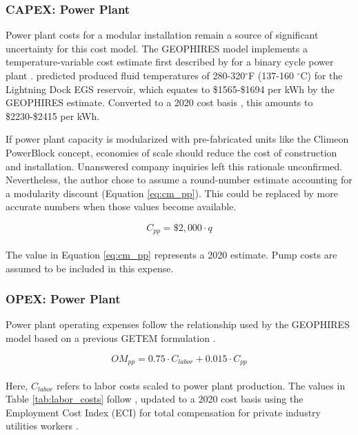 \subsubsection{CAPEX: Power Plant}
\label{ch4:cm_capex_pp}

Power plant costs for a modular installation remain a source of significant uncertainty for this cost model. The GEOPHIRES model implements a temperature-variable cost estimate first described by \citet{tester_future_2006} for a binary cycle power plant \citep{beckers_introducing_2013}. \citet{schochet_development_2001} predicted produced fluid temperatures of 280-320$^\circ$F (137-160 $^\circ$C) for the Lightning Dock EGS reservoir, which equates to \$1565-\$1694 per kWh by the GEOPHIRES estimate. Converted to a 2020 cost basis \citep{us_bls_ppi_2021}, this amounts to \$2230-\$2415 per kWh.

If power plant capacity is modularized with pre-fabricated units like the Climeon PowerBlock concept, economies of scale should reduce the cost of construction and installation. Unanswered company inquiries left this rationale unconfirmed. Nevertheless, the author chose to assume a round-number estimate accounting for a modularity discount (Equation \ref{eq:cm_pp}). This could be replaced by more accurate numbers when those values become available.

\begin{equation}
\label{eq:cm_pp}
    C_{pp} = \$2,000 \cdot q
\end{equation}
\\
The value in Equation \ref{eq:cm_pp} represents a 2020 estimate. Pump costs are assumed to be included in this expense.

\subsubsection{OPEX: Power Plant}
\label{ch4:cm_opex_pp}

Power plant operating expenses follow the relationship used by the GEOPHIRES model based on a previous GETEM formulation \citep[Equation 9,\ ][]{beckers_introducing_2013}.

\begin{equation}
\label{eq:cm_om_pp}
    OM_{pp} = 0.75 \cdot C_{labor} + 0.015 \cdot C_{pp}
\end{equation}
\\
Here, $C_{labor}$ refers to labor costs scaled to power plant production. The values in Table \ref{tab:labor_costs} follow \citet[Equation 10,\ ][]{beckers_introducing_2013}, updated to a 2020 cost basis using the Employment Cost Index (ECI) for total compensation for private industry utilities workers \citep{us_bls_eci_2021}.

